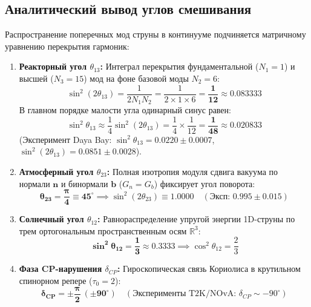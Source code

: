 \documentclass[12pt,a4paper]{article}
\begin{document}
	\subsection{Аналитический вывод углов смешивания}
	Распространение поперечных мод струны в континууме подчиняется матричному уравнению перекрытия гармоник:
	\begin{enumerate}
		\item \textbf{Реакторный угол $\theta_{13}$:} Интеграл перекрытия фундаментальной ($N_1 = 1$) и высшей ($N_3 = 15$) мод на фоне базовой моды $N_2 = 6$:
		\begin{equation}
			\sin^2(2\theta_{13}) = \frac{1}{2 N_1 N_2} = \frac{1}{2 \times 1 \times 6} = \mathbf{\frac{1}{12}} \approx 0.083333
		\end{equation}
		В главном порядке малости угла одинарный синус равен:
		\begin{equation}
			\sin^2\theta_{13} \approx \frac{1}{4} \sin^2(2\theta_{13}) = \frac{1}{4} \times \frac{1}{12} = \mathbf{\frac{1}{48}} \approx \mathbf{0.020833}
		\end{equation}
		(Эксперимент Daya Bay: $\sin^2\theta_{13} = 0.0220 \pm 0.0007$, $\sin^2(2\theta_{13}) = 0.0851 \pm 0.0028$).
		
		\item \textbf{Атмосферный угол $\theta_{23}$:} Полная изотропия модуля сдвига вакуума по нормали $\mathbf{n}$ и бинормали $\mathbf{b}$ ($G_n = G_b$) фиксирует угол поворота:
		\begin{equation}
			\mathbf{\theta_{23} = \frac{\pi}{4} \equiv 45^\circ} \implies \sin^2(2\theta_{23}) \equiv \mathbf{1.0000} \quad (\text{Эксп: } 0.995 \pm 0.015)
		\end{equation}
		
		\item \textbf{Солнечный угол $\theta_{12}$:} Равнораспределение упругой энергии 1D-струны по трем ортогональным пространственным осям $\mathbb{R}^3$:
		\begin{equation}
			\mathbf{\sin^2\theta_{12} = \frac{1}{3} \approx 0.3333} \implies \cos^2\theta_{12} = \frac{2}{3}
		\end{equation}
		
		\item \textbf{Фаза CP-нарушения $\delta_{CP}$:} Гироскопическая связь Кориолиса в крутильном спинорном репере ($\tau_0 = 2$):
		\begin{equation}
			\mathbf{\delta_{CP} = \pm \frac{\pi}{2} \ (\pm 90^\circ)} \quad (\text{Эксперименты T2K/NOvA: } \delta_{CP} \sim -90^\circ)
		\end{equation}
	\end{enumerate}
	
\end{document}
